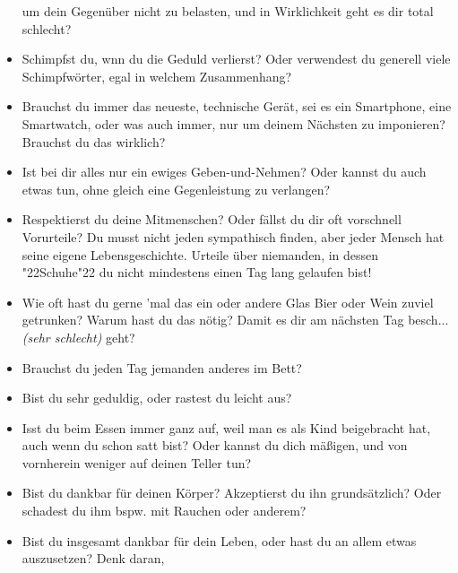 \documentclass[12pt,a5paper]{article}
\newcommand{\q}[1]{\char"22{#1}\char"22 }
\begin{document}
\begin{itemize}[nosep]
					um dein Gegen\"uber nicht zu belasten,
					und in Wirklichkeit geht es dir total schlecht?
					\\
			\item	Schimpfst du,
					wnn du die Geduld verlierst?
					Oder verwendest du generell viele Schimpfw\"orter,
					egal in welchem Zusammenhang?
					\\
			\item	Brauchst du immer das neueste,
					technische Ger\"at,
					sei es ein Smartphone,
					eine Smartwatch,
					oder was auch immer,
					nur um deinem N\"achsten zu imponieren?
					Brauchst du das wirklich?
					\\
			\item	Ist bei dir alles nur ein ewiges Geben-und-Nehmen?
					Oder kannst du auch etwas tun,
					ohne gleich eine Gegenleistung zu verlangen?
					\\
			\item	Respektierst du deine Mitmenschen?
					Oder f\"allst du dir oft vorschnell Vorurteile?
					Du musst nicht jeden sympathisch finden,
					aber jeder Mensch hat seine eigene Lebensgeschichte.
					Urteile \"uber niemanden,
					in dessen \q{Schuhe} du nicht mindestens einen Tag lang gelaufen bist!
					\\
			\item	Wie oft hast du gerne 'mal das ein oder andere Glas Bier oder Wein zuviel getrunken?
					Warum hast du das n\"otig?
					Damit es dir am n\"achsten Tag besch... \textit{(sehr schlecht)} geht?
					\\
			\item	Brauchst du jeden Tag jemanden anderes im Bett?
					\\
			\item	Bist du sehr geduldig,
					oder rastest du leicht aus?
					\\
			\item	Isst du beim Essen immer ganz auf,
					weil man es als Kind beigebracht hat,
					auch wenn du schon satt bist?
					Oder kannst du dich m\"a{\ss}igen,
					und von vornherein weniger auf deinen Teller tun?
					\\
			\item	Bist du dankbar f\"ur deinen K\"orper?
					Akzeptierst du ihn grunds\"atzlich?
					Oder schadest du ihm bspw. mit Rauchen oder anderem?
					\\
			\item	Bist du insgesamt dankbar f\"ur dein Leben,
					oder hast du an allem etwas auszusetzen?
					Denk daran,

\end{itemize}
\end{document}
